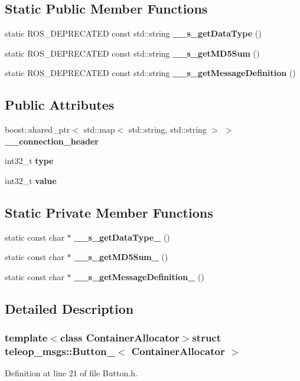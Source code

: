 \subsection*{Static Public Member Functions}
\begin{DoxyCompactItemize}
\item 
static ROS\_\-DEPRECATED const std::string {\bf \_\-\_\-s\_\-getDataType} ()
\item 
static ROS\_\-DEPRECATED const std::string {\bf \_\-\_\-s\_\-getMD5Sum} ()
\item 
static ROS\_\-DEPRECATED const std::string {\bf \_\-\_\-s\_\-getMessageDefinition} ()
\end{DoxyCompactItemize}
\subsection*{Public Attributes}
\begin{DoxyCompactItemize}
\item 
boost::shared\_\-ptr$<$ std::map$<$ std::string, std::string $>$ $>$ {\bf \_\-\_\-connection\_\-header}
\item 
int32\_\-t {\bf type}
\item 
int32\_\-t {\bf value}
\end{DoxyCompactItemize}
\subsection*{Static Private Member Functions}
\begin{DoxyCompactItemize}
\item 
static const char $\ast$ {\bf \_\-\_\-s\_\-getDataType\_\-} ()
\item 
static const char $\ast$ {\bf \_\-\_\-s\_\-getMD5Sum\_\-} ()
\item 
static const char $\ast$ {\bf \_\-\_\-s\_\-getMessageDefinition\_\-} ()
\end{DoxyCompactItemize}


\subsection{Detailed Description}
\subsubsection*{template$<$class ContainerAllocator$>$struct teleop\_\-msgs::Button\_\-$<$ ContainerAllocator $>$}



Definition at line 21 of file Button.h.



